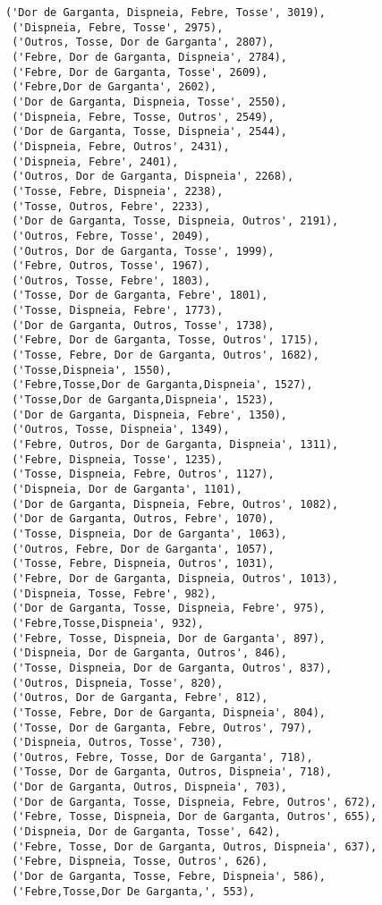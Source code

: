 \documentclass[11pt]{article}
\begin{document}
\begin{tcolorbox}[breakable, size=fbox, boxrule=.5pt, pad at break*=1mm, opacityfill=0]
\begin{Verbatim}[commandchars=\\\{\}]
 ('Dor de Garganta, Dispneia, Febre, Tosse', 3019),
 ('Dispneia, Febre, Tosse', 2975),
 ('Outros, Tosse, Dor de Garganta', 2807),
 ('Febre, Dor de Garganta, Dispneia', 2784),
 ('Febre, Dor de Garganta, Tosse', 2609),
 ('Febre,Dor de Garganta', 2602),
 ('Dor de Garganta, Dispneia, Tosse', 2550),
 ('Dispneia, Febre, Tosse, Outros', 2549),
 ('Dor de Garganta, Tosse, Dispneia', 2544),
 ('Dispneia, Febre, Outros', 2431),
 ('Dispneia, Febre', 2401),
 ('Outros, Dor de Garganta, Dispneia', 2268),
 ('Tosse, Febre, Dispneia', 2238),
 ('Tosse, Outros, Febre', 2233),
 ('Dor de Garganta, Tosse, Dispneia, Outros', 2191),
 ('Outros, Febre, Tosse', 2049),
 ('Outros, Dor de Garganta, Tosse', 1999),
 ('Febre, Outros, Tosse', 1967),
 ('Outros, Tosse, Febre', 1803),
 ('Tosse, Dor de Garganta, Febre', 1801),
 ('Tosse, Dispneia, Febre', 1773),
 ('Dor de Garganta, Outros, Tosse', 1738),
 ('Febre, Dor de Garganta, Tosse, Outros', 1715),
 ('Tosse, Febre, Dor de Garganta, Outros', 1682),
 ('Tosse,Dispneia', 1550),
 ('Febre,Tosse,Dor de Garganta,Dispneia', 1527),
 ('Tosse,Dor de Garganta,Dispneia', 1523),
 ('Dor de Garganta, Dispneia, Febre', 1350),
 ('Outros, Tosse, Dispneia', 1349),
 ('Febre, Outros, Dor de Garganta, Dispneia', 1311),
 ('Febre, Dispneia, Tosse', 1235),
 ('Tosse, Dispneia, Febre, Outros', 1127),
 ('Dispneia, Dor de Garganta', 1101),
 ('Dor de Garganta, Dispneia, Febre, Outros', 1082),
 ('Dor de Garganta, Outros, Febre', 1070),
 ('Tosse, Dispneia, Dor de Garganta', 1063),
 ('Outros, Febre, Dor de Garganta', 1057),
 ('Tosse, Febre, Dispneia, Outros', 1031),
 ('Febre, Dor de Garganta, Dispneia, Outros', 1013),
 ('Dispneia, Tosse, Febre', 982),
 ('Dor de Garganta, Tosse, Dispneia, Febre', 975),
 ('Febre,Tosse,Dispneia', 932),
 ('Febre, Tosse, Dispneia, Dor de Garganta', 897),
 ('Dispneia, Dor de Garganta, Outros', 846),
 ('Tosse, Dispneia, Dor de Garganta, Outros', 837),
 ('Outros, Dispneia, Tosse', 820),
 ('Outros, Dor de Garganta, Febre', 812),
 ('Tosse, Febre, Dor de Garganta, Dispneia', 804),
 ('Tosse, Dor de Garganta, Febre, Outros', 797),
 ('Dispneia, Outros, Tosse', 730),
 ('Outros, Febre, Tosse, Dor de Garganta', 718),
 ('Tosse, Dor de Garganta, Outros, Dispneia', 718),
 ('Dor de Garganta, Outros, Dispneia', 703),
 ('Dor de Garganta, Tosse, Dispneia, Febre, Outros', 672),
 ('Febre, Tosse, Dispneia, Dor de Garganta, Outros', 655),
 ('Dispneia, Dor de Garganta, Tosse', 642),
 ('Febre, Tosse, Dor de Garganta, Outros, Dispneia', 637),
 ('Febre, Dispneia, Tosse, Outros', 626),
 ('Dor de Garganta, Tosse, Febre, Dispneia', 586),
 ('Febre,Tosse,Dor De Garganta,', 553),

\end{Verbatim}
\end{tcolorbox}
\end{document}
